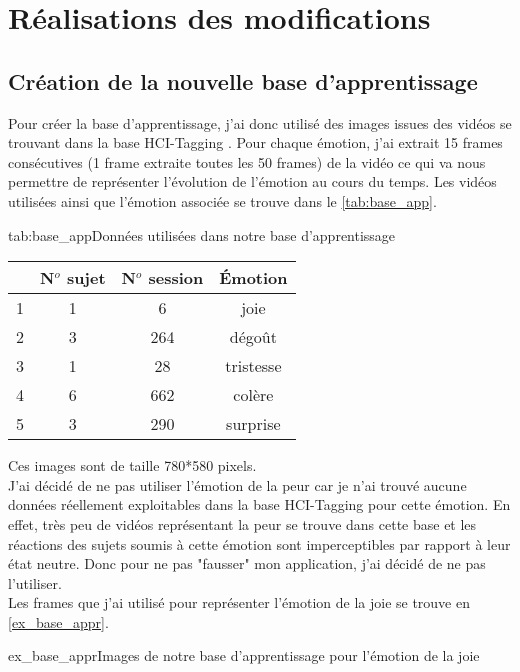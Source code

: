 \documentclass[poster]{polytech/polytech}
\begin{document}
\chapter{Réalisations des \mbox{modifications}}
\newpage

\section{Création de la nouvelle base d'apprentissage}
Pour créer la base d'apprentissage, j'ai donc utilisé des images issues des vidéos se trouvant dans la base HCI-Tagging \cite{tagging1}\cite{tagging2}. Pour chaque émotion, j'ai extrait 15 frames consécutives (1 frame extraite toutes les 50 frames) de la vidéo ce qui va nous permettre de représenter l'évolution de l'émotion au cours du temps. Les vidéos utilisées ainsi que l'émotion associée se trouve dans le \autoref{tab:base_app}.

\begin{Table}{tab:base_app}{Données utilisées dans notre base d'apprentissage}
	\begin{tabular}{|c|c|c|c|}
		\hline
		  &\textbf{N$^{o}$ sujet} &\textbf{N$^{o}$ session}&\textbf{Émotion} \\\hline
		1& 1 & 6& joie\\\hline
		2& 3 & 264& dégoût\\\hline
		3& 1 & 28& tristesse\\\hline
		4& 6 & 662& colère\\\hline
		5& 3 & 290& surprise\\\hline
	\end{tabular}
\end{Table}

Ces images sont de taille 780*580 pixels.\\
J'ai décidé de ne pas utiliser l'émotion de la peur car je n'ai trouvé aucune données réellement exploitables dans la base HCI-Tagging pour cette émotion. En effet, très peu de vidéos représentant la peur se trouve dans cette base et les réactions des sujets soumis à cette émotion sont imperceptibles par rapport à leur état neutre. Donc pour ne pas "fausser" mon application, j'ai décidé de ne pas l'utiliser.\\
Les frames que j'ai utilisé pour représenter l'émotion de la joie se trouve en \autoref{ex_base_appr}.

\begin{Figure}{ex_base_appr}{Images de notre base d'apprentissage pour l'émotion de la joie}
\end{Figure}
\end{document}
